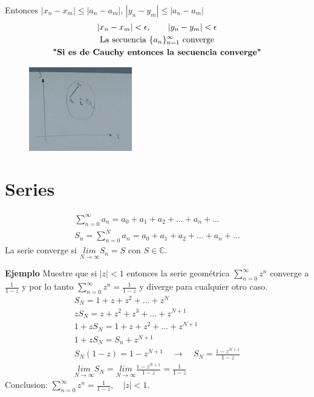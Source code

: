 \documentclass{article}
\begin{document}
Entonces $ \left|x_n - x_m\right| \leq \left|a_n - a_m \right| $, $ \left|y_n - y_m \right|\leq \left|a_n - a_m \right| $
\begin{gather*}
  \left|x_n - x_m \right|<\epsilon, \qquad \left|y_n - y_m \right|<\epsilon\\
  \text{La secuencia }\{a_n \}_{n=1 } ^ {\infty} \text{ converge}\\
  \text{\textbf{"Si es de Cauchy entonces la secuencia converge"}}
\end{gather*}
\begin{figure}[H]
  \begin{center}
    \includegraphics[width=0.4\textwidth]{cauchy.png}
  \end{center}
\end{figure}


\section{Series }
\begin{gather*}
  \sum_{n= 0 }^{\infty} a_n = a_0 + a_1 + a_2 + ... + a_n + ...\\
  S_n = \sum_{n= 0 }^{N }a_n = a_0 + a_1 + a_2 + ... + a_n + ... 
\end{gather*}
La serie converge si $ \underset{N \rightarrow \infty}{lim }S_n = S  $ con $ S \in \mathbb{C} $. 

\textbf{Ejemplo } Muestre que si $ \left|z \right|< 1  $ entonces la serie geométrica $ \sum_{n= 0 }^{\infty} z ^ {n } $ converge a $ \frac{1}{1-z } $ y por lo tanto $ \sum_{n=0 }^{\infty}z ^ {n } =  \frac{1}{1-z } $ y diverge para cualquier otro caso. 
\begin{gather*}
  S_N = 1 + z+z ^ {2 } + ... + z ^ {N }\\
  z S_N = z + z ^2 + z ^ {3 }+ ... + z ^ {N + 1 }\\
  1 + z S_N = 1 + z + z ^2 + ... + z ^ {N + 1 }\\
  1 + z S_N = S_n + z ^ {N+1 }\\
  S_N (1 - z) = 1-z ^ {N+ 1 } \quad \rightarrow \quad S_N = \frac{1- z ^ {N+ 1 }}{1 - z }\\
  \underset{N \rightarrow \infty}{lim } S_N = \underset{N \rightarrow \infty}{lim }\frac{1 - z ^ {N+1 }}{1 - z } = \frac{1}{1-z}
\end{gather*}
Conclusion: $ \sum_{n= 0 }^{\infty}z ^ {n } = \frac{1}{1-z }, \quad \left|z \right|<1$.
\end{document}
